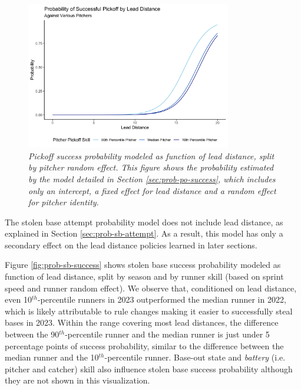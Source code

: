 \documentclass{article}
\begin{document}
      \begin{figure}
        \centering
        \includegraphics[width = 0.8\textwidth]{figures/prob_pickoff_success.png}
        \caption{
          \it Pickoff success probability modeled as function of lead distance, split by pitcher random effect. This figure shows the probability estimated by the model detailed in Section \ref{sec:prob-po-success}, which includes only an intercept, a fixed effect for lead distance and a random effect for pitcher identity.
        }
        \label{fig:prob-pickoff-success}
      \end{figure}

      The stolen base attempt probability model does not include lead distance, as explained in Section \ref{sec:prob-sb-attempt}. As a result, this model has only a secondary effect on the lead distance policies learned in later sections.

      Figure \ref{fig:prob-sb-success} shows stolen base success probability modeled as function of lead distance, split by season and by runner skill (based on sprint speed and runner random effect). We observe that, conditioned on lead distance, even 10$^{th}$-percentile runners in 2023 outperformed the median runner in 2022, which is likely attributable to rule changes making it easier to successfully steal bases in 2023. Within the range covering most lead distances, the difference between the 90$^{th}$-percentile runner and the median runner is just under 5 percentage points of success probability, similar to the difference between the median runner and the 10$^{th}$-percentile runner. Base-out state and {\it battery} (i.e. pitcher and catcher) skill also influence stolen base success probability although they are not shown in this visualization.
      
\end{document}
